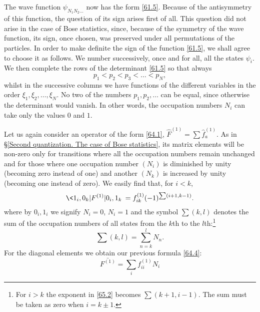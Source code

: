 The wave function $ \psi_{N_1N_2\dots} $ now has the form \eqref{61.5}. Because of the antisymmetry of this function, the question of its sign arises first of all. This question did not arise in the case of Bose statistics, since, because of the symmetry of the wave function, its sign, once chosen, was preserved under all permutations of the particles. In order to make definite the sign of the function \eqref{61.5}, we shall agree to choose it as follows. We number successively, once and for all, all the states $\psi_i$. We then complete the rows of the determinant \eqref{61.5} so that always
\begin{equation}\label{65.1}
p_1<p_2<p_3<\dots<p_N,
\end{equation}
whilst in the successive columns we have functions of the different variables in the order $ \xi_1,\xi_2,\dots,\xi_N $. No two of the numbers $ p_1, p_2, \dots $ can be equal, since otherwise the determinant would vanish. In other words, the occupation numbers $ N_i $ can take only the values $ 0 $ and $ 1 $.

Let us again consider an operator of the form \eqref{64.1}, $ \hat{F}^{(1)}=\sum\hat{f}_a^{(1)} $. As in \S\ref{Second quantization. The case of Bose statistics}, its matrix elements will be non-zero only for transitions where all the occupation numbers remain unchanged and for those where one occupation number $ (N_i) $ is diminished by unity (becoming zero instead of one) and another $ (N_k) $ is increased by unity (becoming one instead of zero). We easily find that, for $ i < k $,
\begin{equation}\label{65.2}
\<1_i,0_k|F^{(1)}|0_i,1_k\>=f_{ik}^{(1)}(-1)^{\sum(i+1,k-1)}.
\end{equation}
where by $ 0_i, 1_i $ we signify $ N_i = 0 $, $ N_i = 1 $ and the symbol $ \sum(k,l) $ denotes the sum of the occupation numbers of all states from the $ k $th to the $ l $th:\footnote{For $ i > k $ the exponent in \eqref{65.2} becomes $ \sum(k+1,i-1) $. The sum must be taken as zero when $ i = k\pm1 $.}
\[ \sum(k,l)=\sum_{n=k}^l N_n. \]
For the diagonal elements we obtain our previous formula \eqref{64.4}:
\begin{equation}\label{65.3}
\bar{F^{(1)}}=\sum_i f_{ii}^{(1)}N_i
\end{equation}



